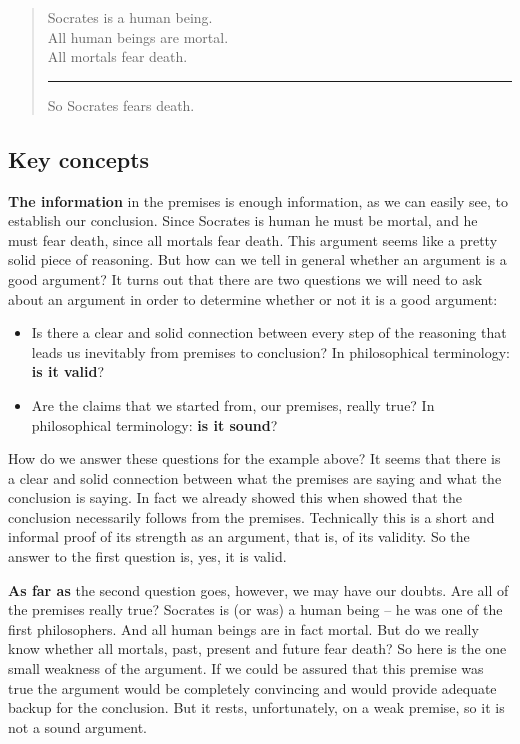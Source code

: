 \documentclass[]{book}
\newenvironment{argument}{\begin{quote}\normalsize}{\end{quote}}
\begin{document}
\begin{argument}
Socrates is a human being.\\
All human beings are mortal.\\
All mortals fear death.\\

\begin{center}\rule{0.5\linewidth}{\linethickness}\end{center}

So Socrates fears death.
\end{argument}

\hypertarget{key-concepts}{%
\subsection*{Key concepts}\label{key-concepts}}


\textbf{The information} in the premises is enough information, as we can easily see, to establish our conclusion. Since Socrates is human he must be mortal, and he must fear death, since all mortals fear death. This argument seems like a pretty solid piece of reasoning. But how can we tell in general whether an argument is a good argument? It turns out that there are two questions we will need to ask about an argument in order to determine whether or not it is a good argument:

\begin{itemize}
\item
  Is there a clear and solid connection between every step of the reasoning that leads us inevitably from premises to conclusion? In philosophical terminology: \textbf{is it valid}?
\item
  Are the claims that we started from, our premises, really true? In philosophical terminology: \textbf{is it sound}?
\end{itemize}

How do we answer these questions for the example above? It seems that there is a clear and solid connection between what the premises are saying and what the conclusion is saying. In fact we already showed this when showed that the conclusion necessarily follows from the premises. Technically this is a short and informal proof of its strength as an argument, that is, of its validity. So the answer to the first question is, yes, it is valid.

\textbf{As far as} the second question goes, however, we may have our doubts. Are all of the premises really true? Socrates is (or was) a human being -- he was one of the first philosophers. And all human beings are in fact mortal. But do we really know whether all mortals, past, present and future fear death? So here is the one small weakness of the argument. If we could be assured that this premise was true the argument would be completely convincing and would provide adequate backup for the conclusion. But it rests, unfortunately, on a weak premise, so it is not a sound argument.
\end{document}
